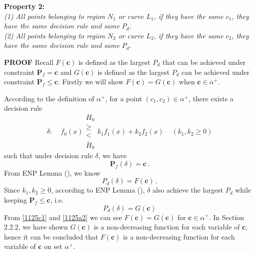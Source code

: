 \noindent \textbf{Property 2:}
\textit{\\(1) All points belonging to region $N_1$ or curve $L_1$, if they have the same $c_1$, they have the same decision rule and same $P_d$.
\\(2) All points belonging to region $N_2$ or curve $L_2$, if they have the same $c_2$, they have the same decision rule and same $P_d$.
}

\noindent \textbf{PROOF}
Recall $F(\mathbf{c})$ is defined as the largest $P_d$ that can be achieved under constraint $\mathbf{P}_f = \mathbf{c}$ and 
       $G(\mathbf{c})$ is defined as the largest $P_d$ can be achieved under constraint $\mathbf{P}_f \leq \mathbf{c}$.
Firstly we will show $F(\mathbf{c}) = G(\mathbf{c}) $ when $\mathbf{c} \in \alpha^+$.

According to the definition of $\alpha^+$, for a point $(c_1, c_2) \in \alpha^+$, there exists a decision rule 
\[
\delta:\;\;\;\;f_0(x) \substack{H_0 \\ \geq \\ < \\ \bar{H}_0} k_1f_1(x) + k_2f_2(x) \;\;\;\;(k_1, k_2 \geq 0)
\]
such that under decision rule $\delta$, we have 
\begin{equation}
\label{1125a3}
\mathbf{P}_{f}(\delta) = \mathbf{c}\,.
\end{equation}
From ENP Lemma (), we know 
\begin{equation}
\label{1125c1}
P_d(\delta) = F(\mathbf{c})\,.
\end{equation}
Since $k_1, k_2 \geq 0$, according to ENP Lemma (), $\delta$ also achieve the largest $P_d$ while keeping $\mathbf{P}_f \leq \mathbf{c}$, i.e. 
\begin{equation}
 P_d(\delta) =G(\mathbf{c}) 
\label{1125a2}
\end{equation}
From \eqref{1125c1} and \eqref{1125a2} we can see $F(\mathbf{c}) = G(\mathbf{c})$ for $\mathbf{c} \in \alpha^+$.
In Section 2.2.2,  we have shown $G(\mathbf{c})$ is a non-decreasing function for each variable of $\mathbf{c}$, hence it can be concluded that $F(\mathbf{c})$ is a non-decreasing function for each variable of $\mathbf{c}$ on set $\alpha^+$.

